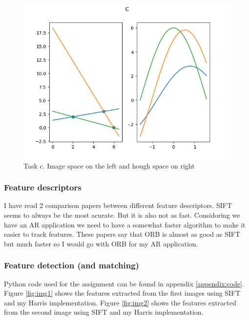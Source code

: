 \documentclass{article}
\begin{document}
    \begin{figure}[H]
        \centering
        \includegraphics[width=1\textwidth]{Finished/HoughB.png}
        \caption{Task c. Image space on the left and hough space on right}
        \label{fig:hc}
    \end{figure}
    \subsubsection{Feature descriptors}
    I have read 2 comparison papers between different feature descriptors. SIFT seems to always be the most acurate.
    But it is also not as fast. Considoring we have an AR application we need to have a somewhat faster algorithm
    to make it easier to track features. These papers say that ORB is almost as good as SIFT but much faster so I would
    go with ORB for my AR application. \cite{art1} \cite{tareen2018comparative}
    \subsubsection{Feature detection (and matching)}
    Python code used for the assignment can be found in appendix \ref{appendix:code}.
    Figure \ref{fig:img1} shows the features extracted from the first images using SIFT and my Harris implementation. Figure \ref{fig:img2}
    shows the features extracted from the second image using SIFT and my Harris implementation.
\end{document}
